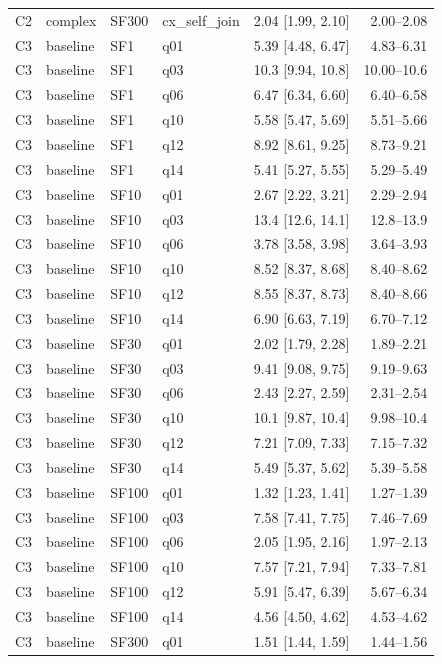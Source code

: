 \begin{longtable}{lllllr}
C2 & complex & SF300 & cx\_self\_join & 2.04 [1.99, 2.10] & 2.00--2.08 \\
C3 & baseline & SF1 & q01 & 5.39 [4.48, 6.47] & 4.83--6.31 \\
C3 & baseline & SF1 & q03 & 10.3 [9.94, 10.8] & 10.00--10.6 \\
C3 & baseline & SF1 & q06 & 6.47 [6.34, 6.60] & 6.40--6.58 \\
C3 & baseline & SF1 & q10 & 5.58 [5.47, 5.69] & 5.51--5.66 \\
C3 & baseline & SF1 & q12 & 8.92 [8.61, 9.25] & 8.73--9.21 \\
C3 & baseline & SF1 & q14 & 5.41 [5.27, 5.55] & 5.29--5.49 \\
C3 & baseline & SF10 & q01 & 2.67 [2.22, 3.21] & 2.29--2.94 \\
C3 & baseline & SF10 & q03 & 13.4 [12.6, 14.1] & 12.8--13.9 \\
C3 & baseline & SF10 & q06 & 3.78 [3.58, 3.98] & 3.64--3.93 \\
C3 & baseline & SF10 & q10 & 8.52 [8.37, 8.68] & 8.40--8.62 \\
C3 & baseline & SF10 & q12 & 8.55 [8.37, 8.73] & 8.40--8.66 \\
C3 & baseline & SF10 & q14 & 6.90 [6.63, 7.19] & 6.70--7.12 \\
C3 & baseline & SF30 & q01 & 2.02 [1.79, 2.28] & 1.89--2.21 \\
C3 & baseline & SF30 & q03 & 9.41 [9.08, 9.75] & 9.19--9.63 \\
C3 & baseline & SF30 & q06 & 2.43 [2.27, 2.59] & 2.31--2.54 \\
C3 & baseline & SF30 & q10 & 10.1 [9.87, 10.4] & 9.98--10.4 \\
C3 & baseline & SF30 & q12 & 7.21 [7.09, 7.33] & 7.15--7.32 \\
C3 & baseline & SF30 & q14 & 5.49 [5.37, 5.62] & 5.39--5.58 \\
C3 & baseline & SF100 & q01 & 1.32 [1.23, 1.41] & 1.27--1.39 \\
C3 & baseline & SF100 & q03 & 7.58 [7.41, 7.75] & 7.46--7.69 \\
C3 & baseline & SF100 & q06 & 2.05 [1.95, 2.16] & 1.97--2.13 \\
C3 & baseline & SF100 & q10 & 7.57 [7.21, 7.94] & 7.33--7.81 \\
C3 & baseline & SF100 & q12 & 5.91 [5.47, 6.39] & 5.67--6.34 \\
C3 & baseline & SF100 & q14 & 4.56 [4.50, 4.62] & 4.53--4.62 \\
C3 & baseline & SF300 & q01 & 1.51 [1.44, 1.59] & 1.44--1.56 \\

\end{longtable}
